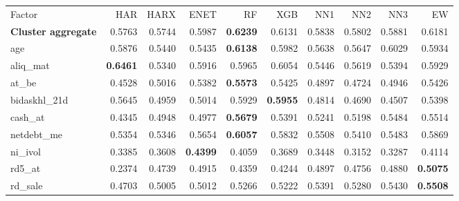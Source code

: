 \begin{longtable}{>{\raggedright\arraybackslash}p{2.6cm}rrrrrrrrr}
\hline
\multicolumn{10}{@{}l}{\textit{Panel D. Low Leverage}} \\
\hline
Factor & HAR & HARX & ENET & RF & XGB & NN1 & NN2 & NN3 & EW \\
\hline
\textbf{Cluster aggregate} & 0.5763 & 0.5744 & \cellcolor{blue!10}0.5987 & \textbf{\cellcolor{blue!10}0.6239} & \cellcolor{blue!10}0.6131 & \cellcolor{blue!10}0.5838 & \cellcolor{blue!10}0.5802 & \cellcolor{blue!10}0.5881 & \cellcolor{blue!10}0.6181 \\
age & 0.5876 & 0.5440 & 0.5435 & \textbf{\cellcolor{blue!10}0.6138} & \cellcolor{blue!10}0.5982 & 0.5638 & 0.5647 & \cellcolor{blue!10}0.6029 & \cellcolor{blue!10}0.5934 \\
aliq\_mat & \textbf{0.6461} & 0.5340 & 0.5916 & 0.5965 & 0.6054 & 0.5446 & 0.5619 & 0.5394 & 0.5929 \\
at\_be & 0.4528 & \cellcolor{blue!10}0.5016 & \cellcolor{blue!10}0.5382 & \textbf{\cellcolor{blue!10}0.5573} & \cellcolor{blue!10}0.5425 & \cellcolor{blue!10}0.4897 & \cellcolor{blue!10}0.4724 & \cellcolor{blue!10}0.4946 & \cellcolor{blue!10}0.5426 \\
bidaskhl\_21d & 0.5645 & 0.4959 & 0.5014 & \cellcolor{blue!10}0.5929 & \textbf{\cellcolor{blue!10}0.5955} & 0.4814 & 0.4690 & 0.4507 & 0.5398 \\
cash\_at & 0.4345 & \cellcolor{blue!10}0.4948 & \cellcolor{blue!10}0.4977 & \textbf{\cellcolor{blue!10}0.5679} & \cellcolor{blue!10}0.5391 & \cellcolor{blue!10}0.5241 & \cellcolor{blue!10}0.5198 & \cellcolor{blue!10}0.5484 & \cellcolor{blue!10}0.5514 \\
netdebt\_me & 0.5354 & 0.5346 & \cellcolor{blue!10}0.5654 & \textbf{\cellcolor{blue!10}0.6057} & \cellcolor{blue!10}0.5832 & \cellcolor{blue!10}0.5508 & \cellcolor{blue!10}0.5410 & \cellcolor{blue!10}0.5483 & \cellcolor{blue!10}0.5869 \\
ni\_ivol & 0.3385 & \cellcolor{blue!10}0.3608 & \textbf{\cellcolor{blue!10}0.4399} & \cellcolor{blue!10}0.4059 & \cellcolor{blue!10}0.3689 & \cellcolor{blue!10}0.3448 & 0.3152 & 0.3287 & \cellcolor{blue!10}0.4114 \\
rd5\_at & 0.2374 & \cellcolor{blue!10}0.4739 & \cellcolor{blue!10}0.4915 & \cellcolor{blue!10}0.4359 & \cellcolor{blue!10}0.4244 & \cellcolor{blue!10}0.4897 & \cellcolor{blue!10}0.4756 & \cellcolor{blue!10}0.4880 & \textbf{\cellcolor{blue!10}0.5075} \\
rd\_sale & 0.4703 & \cellcolor{blue!10}0.5005 & \cellcolor{blue!10}0.5012 & \cellcolor{blue!10}0.5266 & \cellcolor{blue!10}0.5222 & \cellcolor{blue!10}0.5391 & \cellcolor{blue!10}0.5280 & \cellcolor{blue!10}0.5430 & \textbf{\cellcolor{blue!10}0.5508} \\

\end{longtable}
